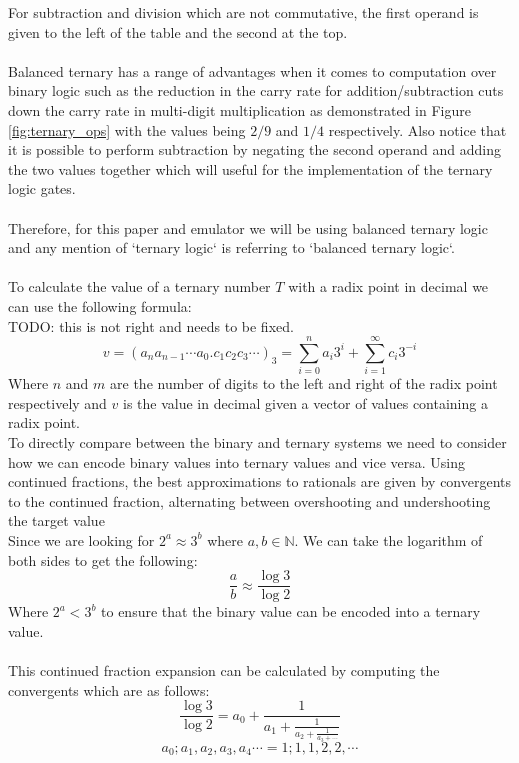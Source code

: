 \documentclass[12pt]{article}
\begin{document}
For subtraction and division which are not commutative, the first operand is given to the left of the table and the second at the top.\\
\\
Balanced ternary has a range of advantages when it comes to computation over binary logic such as the reduction in the carry rate for 
addition/subtraction cuts down the carry rate in multi-digit multiplication as demonstrated in Figure \ref{fig:ternary_ops} with 
the values being $2/9$ and $1/4$ respectively. Also notice that it is possible to perform subtraction by negating the second operand and 
adding the two values together which will useful for the implementation of the ternary logic gates.\\
\\
Therefore, for this paper and emulator we will be using balanced ternary logic and any mention of `ternary logic` is referring to 
`balanced ternary logic`.\\
\\
To calculate the value of a ternary number $T$ with a radix point in decimal we can use the following formula:\\
TODO: this is not right and needs to be fixed.\\
\begin{equation}
    v = (a_{n}a_{n-1} \dotsb a_{0}.c_{1}c_{2}c_{3} \dotsb)_3 = \sum_{i=0}^{n} a_{i} 3^{i} + \sum_{i=1}^{\infty} c_{i} 3^{-i}
\end{equation}
Where $n$ and $m$ are the number of digits to the left and right of the radix point respectively and $v$ is the value in decimal given 
a vector of values containing a radix point.\\

To directly compare between the binary and ternary systems we need to consider how we can encode binary values into ternary values and 
vice versa. Using continued fractions, the best approximations to rationals are given by convergents to the continued fraction, 
alternating between overshooting and undershooting the target value
\\
Since we are looking for $2^{a} \approx 3^{b}$ where $a,b \in \mathbb{N}$. We can take the logarithm of both sides to get the following:
\begin{equation}
    \frac{a}{b} \approx \frac{\log 3}{\log 2}
\end{equation}
Where $2^{a} < 3^{b}$ to ensure that the binary value can be encoded into a ternary value.\\
\\
This continued fraction expansion can be calculated by computing the convergents which are as follows:
\begin{equation}
    \frac{\log 3}{\log 2} = a_0 + \frac{1}{a_1 + \frac{1}{a_2 + \frac{1}{a_3 + \dotsb}}}
\end{equation}
\begin{equation}
    {a_0; a_1, a_2, a_3, a_4 \dotsb} = {1; 1, 1, 2, 2, \dotsb}
\end{equation}
\end{document}
